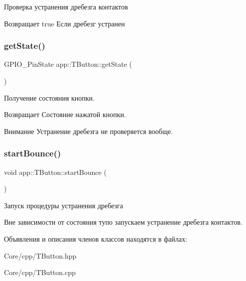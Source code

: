 Проверка устранения дребезга контактов 

\begin{DoxyReturn}{Возвращает}
true Если дребезг устранен 
\end{DoxyReturn}
\mbox{\label{classapp_1_1_t_button_a1d6cf41ee0a98746592b1d604041f8ce}} 
\subsubsection{\texorpdfstring{get\+State()}{getState()}}
{\footnotesize\ttfamily G\+P\+I\+O\+\_\+\+Pin\+State app\+::\+T\+Button\+::get\+State (\begin{DoxyParamCaption}{ }\end{DoxyParamCaption})}



Получение состояния кнопки. 

\begin{DoxyReturn}{Возвращает}
Состояние нажатой кнопки. 
\end{DoxyReturn}
\begin{DoxyAttention}{Внимание}
Устранение дребезга не проверяется вообще. 
\end{DoxyAttention}
\mbox{\label{classapp_1_1_t_button_a92fc2dcb3d54a563b7b1a96900a4717c}} 
\subsubsection{\texorpdfstring{start\+Bounce()}{startBounce()}}
{\footnotesize\ttfamily void app\+::\+T\+Button\+::start\+Bounce (\begin{DoxyParamCaption}{ }\end{DoxyParamCaption})}



Запуск процедуры устранения дребезга 

Вне зависимости от состояния тупо запускаем устранение дребезга контактов. 

Объявления и описания членов классов находятся в файлах\+:\begin{DoxyCompactItemize}
\item 
Core/cpp/T\+Button.\+hpp\item 
Core/cpp/T\+Button.\+cpp\end{DoxyCompactItemize}
